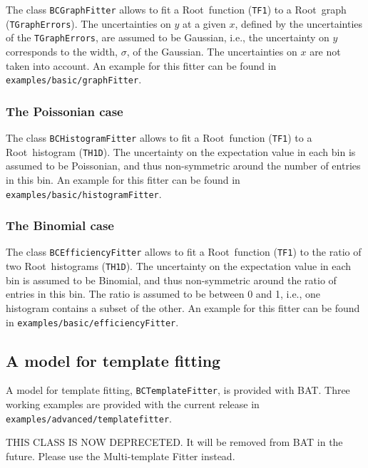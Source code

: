 \documentclass[11pt, a4paper]{article}
\newcommand{\Root}{{\sc Root}}
\begin{document}
The class \verb|BCGraphFitter| allows to fit a \Root\ function
(\verb|TF1|) to a \Root\ graph (\verb|TGraphErrors|). The
uncertainties on $y$ at a given $x$, defined by the uncertainties of
the \verb|TGraphErrors|, are assumed to be Gaussian, i.e., the
uncertainty on $y$ corresponds to the width, $\sigma$, of the
Gaussian. The uncertainties on $x$ are not taken into account.  An
example for this fitter can be found in
\verb|examples/basic/graphFitter|.


\subsubsection{The Poissonian case}

The class \verb|BCHistogramFitter| allows to fit a \Root\ function
(\verb|TF1|) to a \Root\ histogram (\verb|TH1D|). The uncertainty on
the expectation value in each bin is assumed to be Poissonian, and
thus non-symmetric around the number of entries in this bin.  An
example for this fitter can be found in
\verb|examples/basic/histogramFitter|.


\subsubsection{The Binomial case}

The class \verb|BCEfficiencyFitter| allows to fit a \Root\ function
(\verb|TF1|) to the ratio of two \Root\ histograms (\verb|TH1D|). The
uncertainty on the expectation value in each bin is assumed to be
Binomial, and thus non-symmetric around the ratio of entries in this
bin. The ratio is assumed to be between 0 and 1, i.e., one histogram
contains a subset of the other.  An example for this fitter can be
found in \verb|examples/basic/efficiencyFitter|.

\subsection{A model for template fitting}

A model for template fitting, \verb|BCTemplateFitter|, is provided
with BAT. Three working examples are provided with the current release in
\verb|examples/advanced/templatefitter|.

\smallskip

THIS CLASS IS NOW DEPRECETED. \newline
It will be removed from BAT in the future.
Please use the Multi-template Fitter instead.
\end{document}
